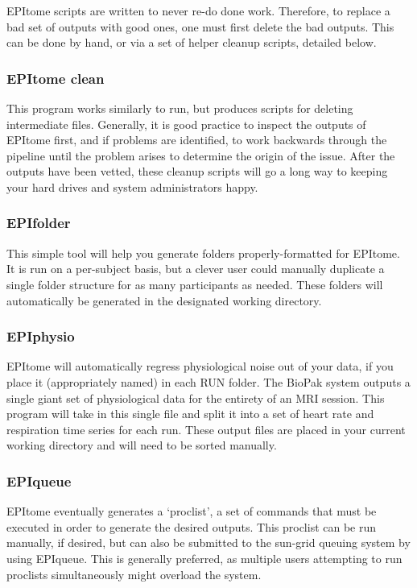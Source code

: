 \documentclass[final,titlepage,letterpaper,oneside,12pt]{article}
\renewcommand{\texttt}[2][BrickRed]{\textcolor{#1}{\ttfamily #2}}%
\begin{document}
EPItome scripts are written to never re-do done work. Therefore, to replace a bad set of outputs with good ones, one must first delete the bad outputs. This can be done by hand, or via a set of helper cleanup scripts, detailed below.

\subsubsection{EPItome clean}

This program works similarly to \texttt{run}, but produces scripts for deleting intermediate files. Generally, it is good practice to inspect the outputs of EPItome first, and if problems are identified, to work backwards through the pipeline until the problem arises to determine the origin of the issue. After the outputs have been vetted, these cleanup scripts will go a long way to keeping your hard drives and system administrators happy.

\subsubsection{EPIfolder}

This simple tool will help you generate folders properly-formatted for EPItome. It is run on a per-subject basis, but a clever user could manually duplicate a single folder structure for as many participants as needed. These folders will automatically be generated in the designated working directory.

\subsubsection{EPIphysio}

EPItome will automatically regress physiological noise out of your data, if you place it (appropriately named) in each RUN folder. The BioPak system outputs a single giant set of physiological data for the entirety of an MRI session. This program will take in this single file and split it into a set of heart rate and respiration time series for each run. These output files are placed in your current working directory and will need to be sorted manually.

\subsubsection{EPIqueue}

EPItome eventually generates a `proclist', a set of commands that must be executed in order to generate the desired outputs. This proclist can be run manually, if desired, but can also be submitted to the sun-grid queuing system by using EPIqueue. This is generally preferred, as multiple users attempting to run proclists simultaneously might overload the system.
\end{document}
